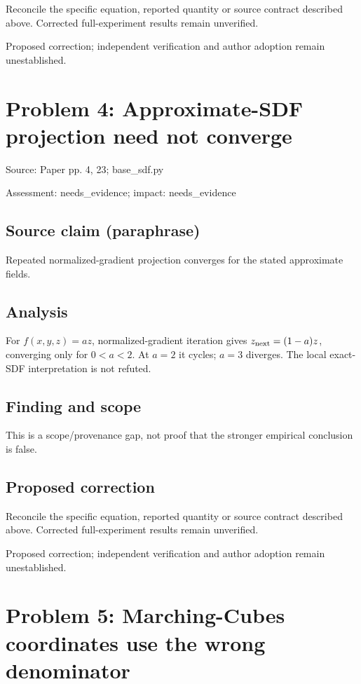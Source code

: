 \documentclass[11pt]{article}
\begin{document}
Reconcile the specific equation, reported quantity or source contract described above. Corrected full-experiment results remain unverified.

Proposed correction; independent verification and author adoption remain unestablished.

\section*{Problem 4: Approximate-SDF projection need not converge}

Source: Paper pp. 4, 23; base\_sdf.py

Assessment: needs\_evidence; impact: needs\_evidence

\subsection*{Source claim (paraphrase)}

Repeated normalized-gradient projection converges for the stated approximate fields.

\subsection*{Analysis}

For \(f(x,y,z)=az\), normalized-gradient iteration gives \(z_{\rm next}=(1-a)z\), converging only for \(0<a<2\). At \(a=2\) it cycles; \(a=3\) diverges. The local exact-SDF interpretation is not refuted.

\subsection*{Finding and scope}

This is a scope/provenance gap, not proof that the stronger empirical conclusion is false.

\subsection*{Proposed correction}

Reconcile the specific equation, reported quantity or source contract described above. Corrected full-experiment results remain unverified.

Proposed correction; independent verification and author adoption remain unestablished.

\section*{Problem 5: Marching-Cubes coordinates use the wrong denominator}
\end{document}
